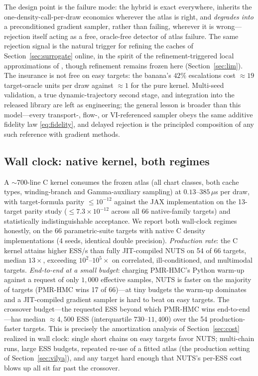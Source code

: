 \documentclass[11pt]{article}
\theoremstyle{remark}
\begin{document}
The design point is the failure mode: the hybrid is exact everywhere,
inherits the one-density-call-per-draw economics wherever the atlas
is right, and \emph{degrades into} a preconditioned gradient sampler,
rather than failing, wherever it is wrong---rejection itself acting
as a free, oracle-free detector of atlas failure. The same rejection
signal is the natural trigger for refining the caches of
Section~\ref{sec:surrogate} online, in the spirit of the
refinement-triggered local approximations of \citet{conrad2016},
though refinement remains frozen here (Section~\ref{sec:lim}). The
insurance is not free on easy targets: the banana's $42\%$
escalations cost $\approx19$ target-oracle units per draw against
$\approx1$ for the pure kernel. Multi-seed validation, a true
dynamic-trajectory second stage, and integration into the released
library are left as engineering; the general lesson is broader than
this model---every transport-, flow-, or VI-referenced sampler obeys
the same additive fidelity law \eqref{eq:fidelity}, and delayed
rejection is the principled composition of any such reference with
gradient methods.

\subsection{Wall clock: native kernel, both regimes}\label{sec:native}
A $\sim$700-line C kernel consumes the frozen atlas (all chart classes,
both cache types, winding-branch and Gamma-auxiliary sampling) at
$0.13$--$385\,\mu$s per draw, with target-formula parity $\le10^{-12}$
against the JAX implementation on the 13-target parity study
($\le7.3\times10^{-12}$ across all 66 native-family targets) and
statistically indistinguishable acceptance. We report both wall-clock
regimes honestly, on the 66 parametric-suite targets with native C
density implementations (4 seeds, identical double precision).
\emph{Production rate}: the C kernel attains higher ESS/s than fully
JIT-compiled NUTS on 54 of 66 targets, median $13\times$, exceeding
$10^2$--$10^5\times$ on correlated, ill-conditioned, and multimodal
targets. \emph{End-to-end at a small budget}: charging PMR-HMC's Python
warm-up against a request of only $1{,}000$ effective samples, NUTS is
faster on the majority of targets (PMR-HMC wins 17 of 66)---at tiny
budgets the warm-up dominates and a JIT-compiled gradient sampler is
hard to beat on easy targets. The crossover budget---the requested ESS
beyond which PMR-HMC wins end-to-end---has median $\approx4{,}500$ ESS
(interquartile $730$--$11{,}400$) over the 54 production-faster
targets. This is precisely the amortization analysis of
Section~\ref{sec:cost} realized in wall clock: single short chains on
easy targets favor NUTS; multi-chain runs, large ESS budgets, repeated
re-use of a fitted atlas (the production setting of
Section~\ref{sec:vilya}), and any target hard enough that NUTS's
per-ESS cost blows up all sit far past the crossover.
\end{document}
